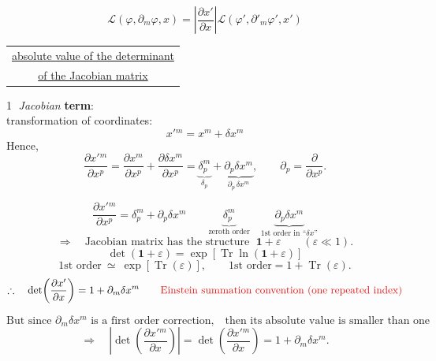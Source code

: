 \documentclass[11pt,a4paper]{article}
\newcommand{\rednote}[1]{\textcolor{noteRed}{#1}}
\begin{document}
\pagestyle{empty}

\begin{minipage}{0.47\linewidth}
\[
\mathcal{L}(\varphi,\partial_m\varphi,x)
 =\left|\frac{\partial x'}{\partial x}\right|
 \mathcal{L}(\varphi',\partial'_m\varphi',x')
\]
\vspace{-8pt}
\begin{center}\small\begin{tabular}{c}\underline{absolute value of the determinant}\\[-2pt]\underline{of the Jacobian matrix}\end{tabular}\end{center}
\end{minipage}\hfill
\begin{minipage}{0.49\linewidth}
\begin{center}\end{center}
\textcircled{1} \textit{Jacobian} \textbf{term}:\\[-2pt]
transformation of coordinates:
\[
x'{}^m=x^m+\delta x^m
\]
Hence,
\[
\frac{\partial x'{}^m}{\partial x^p}
=\frac{\partial x^m}{\partial x^p}
 +\frac{\partial\delta x^m}{\partial x^p}
=\underbrace{\delta^m_p}_{\delta_p}
 +\underbrace{\partial_p\delta x^m}_{\partial_p\,\delta x^m},
\qquad \partial_p=\frac{\partial}{\partial x^p}.
\]
\end{minipage}

\[
\frac{\partial x'{}^m}{\partial x^p}
=\delta^m_p+\partial_p\delta x^m
\qquad
\underbrace{\delta^m_p}_{\text{zeroth order}}
\quad
\underbrace{\partial_p\delta x^m}_{\text{1st order in ``$\delta x$''}}
\]
\[
\Longrightarrow\quad \text{Jacobian matrix has the structure }\;\mathbf{1}+\varepsilon
\qquad (\varepsilon\ll1).
\]
\[
\det(\mathbf{1}+\varepsilon)=\exp\!\left[\operatorname{Tr}\ln(\mathbf{1}+\varepsilon)\right]
\]
\[
\text{1st order}\ \simeq\ \exp[\operatorname{Tr}(\varepsilon)],
\qquad
\text{1st order}=1+\operatorname{Tr}(\varepsilon).
\]
\[
\therefore\quad
\det\!\left(\frac{\partial x'}{\partial x}\right)
=1+\partial_m\delta x^m
\qquad
\rednote{\text{Einstein summation convention (one repeated index)}}
\]

\[
\text{But since }\partial_m\delta x^m\text{ is a first order correction,}
\quad\text{then its absolute value is smaller than one}
\]
\[
\Longrightarrow\quad
\left|\det\!\left(\frac{\partial x'{}^m}{\partial x}\right)\right|
=\det\!\left(\frac{\partial x'{}^m}{\partial x}\right)
=1+\partial_m\delta x^m.
\]
\end{document}
